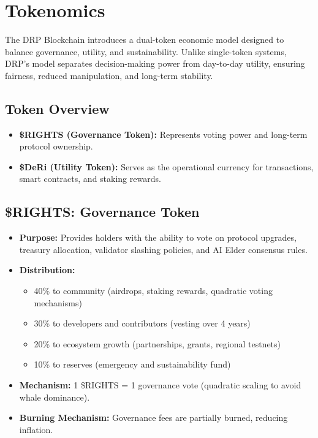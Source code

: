 \documentclass[11pt,a4paper]{article}
\begin{document}
\section{Tokenomics}

The DRP Blockchain introduces a dual-token economic model designed to balance governance, utility, and sustainability. Unlike single-token systems, DRP’s model separates decision-making power from day-to-day utility, ensuring fairness, reduced manipulation, and long-term stability.

\subsection{Token Overview}
\begin{itemize}
    \item \textbf{\$RIGHTS (Governance Token):} Represents voting power and long-term protocol ownership.  
    \item \textbf{\$DeRi (Utility Token):} Serves as the operational currency for transactions, smart contracts, and staking rewards.  
\end{itemize}

\subsection{\$RIGHTS: Governance Token}
\begin{itemize}
    \item \textbf{Purpose:} Provides holders with the ability to vote on protocol upgrades, treasury allocation, validator slashing policies, and AI Elder consensus rules.  
    \item \textbf{Distribution:}  
        \begin{itemize}
            \item 40\% to community (airdrops, staking rewards, quadratic voting mechanisms)  
            \item 30\% to developers and contributors (vesting over 4 years)  
            \item 20\% to ecosystem growth (partnerships, grants, regional testnets)  
            \item 10\% to reserves (emergency and sustainability fund)  
        \end{itemize}
    \item \textbf{Mechanism:} 1 \$RIGHTS = 1 governance vote (quadratic scaling to avoid whale dominance).  
    \item \textbf{Burning Mechanism:} Governance fees are partially burned, reducing inflation.  
\end{itemize}
\end{document}
